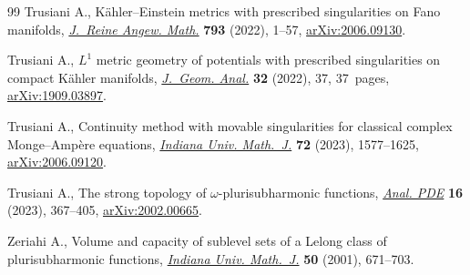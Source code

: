 \documentclass[pdftex]{sigma}
\numberwithin{equation}{section}
\theoremstyle{plain}
\begin{document}
\begin{thebibliography}{99}
Trusiani A., K\"ahler--{E}instein metrics with prescribed singularities on
 {F}ano manifolds, \href{https://doi.org/10.1515/crelle-2022-0047}{\textit{J.~Reine Angew. Math.}} \textbf{793} (2022), 1--57,
 \href{https://arxiv.org/abs/2006.09130}{arXiv:2006.09130}.

Trusiani A., {$L^1$} metric geometry of potentials with prescribed
 singularities on compact {K}\"ahler manifolds, \href{https://doi.org/10.1007/s12220-021-00779-x}{\textit{J.~Geom. Anal.}}
 \textbf{32} (2022), 37, 37~pages, \href{https://arxiv.org/abs/1909.03897}{arXiv:1909.03897}.

Trusiani A., Continuity method with movable singularities for classical complex
 {M}onge--{A}mp\`ere equations, \href{https://doi.org/10.1512/iumj.2023.72.9316}{\textit{Indiana Univ. Math.~J.}} \textbf{72}
 (2023), 1577--1625, \href{https://arxiv.org/abs/2006.09120}{arXiv:2006.09120}.

Trusiani A., The strong topology of {$\omega$}-plurisubharmonic functions,
 \href{https://doi.org/10.2140/apde.2023.16.367}{\textit{Anal. PDE}} \textbf{16} (2023), 367--405, \href{https://arxiv.org/abs/2002.00665}{arXiv:2002.00665}.

Zeriahi A., Volume and capacity of sublevel sets of a {L}elong class of
 plurisubharmonic functions, \href{https://doi.org/10.1512/iumj.2001.50.2062}{\textit{Indiana Univ. Math.~J.}} \textbf{50}
 (2001), 671--703.

\end{thebibliography}\LastPageEnding
\end{document}
